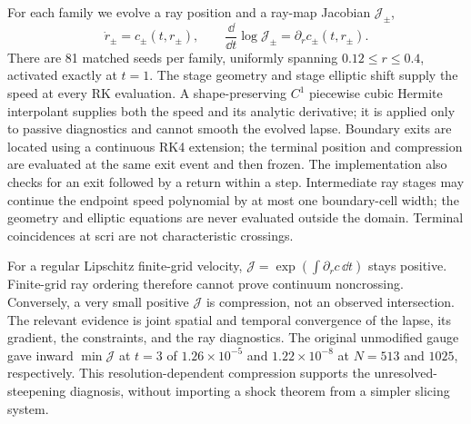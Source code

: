 For each family we evolve a ray position and a ray-map Jacobian $\mathcal J_\pm$,
\begin{equation}
 \dot r_\pm=c_\pm(t,r_\pm),\qquad
 \frac{\dd}{\dd t}\log\mathcal J_\pm=\partial_r c_\pm(t,r_\pm).
\label{eq:telegraph-rays}
\end{equation}
There are 81 matched seeds per family, uniformly spanning $0.12\leq r\leq0.4$, activated exactly at $t=1$. The stage geometry and stage elliptic shift supply the speed at every RK evaluation. A shape-preserving $C^1$ piecewise cubic Hermite interpolant supplies both the speed and its analytic derivative\cite{PCHIP}; it is applied only to passive diagnostics and cannot smooth the evolved lapse. Boundary exits are located using a continuous RK4 extension\cite{RK4Dense}; the terminal position and compression are evaluated at the same exit event and then frozen. The implementation also checks for an exit followed by a return within a step. Intermediate ray stages may continue the endpoint speed polynomial by at most one boundary-cell width; the geometry and elliptic equations are never evaluated outside the domain. Terminal coincidences at scri are not characteristic crossings.

For a regular Lipschitz finite-grid velocity, $\mathcal J=\exp(\int\partial_rc\,\dd t)$ stays positive. Finite-grid ray ordering therefore cannot prove continuum noncrossing. Conversely, a very small positive $\mathcal J$ is compression, not an observed intersection. The relevant evidence is joint spatial and temporal convergence of the lapse, its gradient, the constraints, and the ray diagnostics. The original unmodified gauge gave inward $\min\mathcal J$ at $t=3$ of $1.26\times10^{-5}$ and $1.22\times10^{-8}$ at $N=513$ and $1025$, respectively. This resolution-dependent compression supports the unresolved-steepening diagnosis, without importing a shock theorem from a simpler slicing system\cite{Alcubierre2005}.

